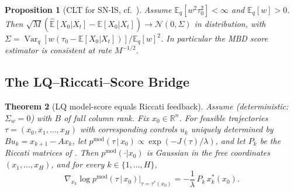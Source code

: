 \documentclass[11pt,letterpaper]{article}
\theoremstyle{plain}
\newtheorem{theorem}{Theorem}[section]
\newtheorem{proposition}[theorem]{Proposition}
\theoremstyle{definition}
\theoremstyle{remark}
\newcommand{\R}{\mathbb{R}}
\newcommand{\E}{\mathbb{E}}
\newcommand{\Var}{\operatorname{Var}}
\newcommand{\calN}{\mathcal{N}}
\newcommand{\grad}{\nabla}
\begin{document}
\begin{proposition}[CLT for SN-IS, cf.\ {\citep[Thm.~9.2]{owen2013mcb}}]\label{prop:snis}
Assume $\E_q[w^2\tau_0^2]<\infty$ and $\E_q[w]>0$. Then
$\sqrt{M}(\widehat{\E}[X_0|X_t]-\E[X_0|X_t])\to\calN(0,\Sigma)$ in
distribution, with $\Sigma=\Var_q[w(\tau_0-\E[X_0|X_t])]/\E_q[w]^2$.
In particular the MBD score estimator is consistent at rate $M^{-1/2}$.
\end{proposition}

\subsection{The LQ--Riccati--Score Bridge}

\begin{theorem}[LQ model-score equals Riccati feedback]\label{thm:lq-score-app}
Assume  (deterministic: $\Sigma_w=0$) with $B$ of full column
rank. Fix $x_0\in\R^n$. For feasible trajectories
$\tau=(x_0,x_1,\dots,x_H)$ with corresponding controls $u_k$ uniquely
determined by $Bu_k=x_{k+1}-Ax_k$, let
$p^{\mathrm{mod}}(\tau\,|\,x_0)\propto\exp(-J(\tau)/\lambda)$,
and let $P_k$ be the Riccati matrices of . Then
$p^{\mathrm{mod}}(\cdot|x_0)$ is Gaussian in the free coordinates
$(x_1,\dots,x_H)$, and for every $k\in\{1,\dots,H\}$,
\begin{equation}
  \grad_{x_k}\log p^{\mathrm{mod}}(\tau\,|\,x_0)\bigg|_{\tau=\tau^*(x_0)}
  = -\frac{1}{\lambda}\,P_k\,x_k^*(x_0).
  \label{eq:lq-score-app}
\end{equation}
\end{theorem}
\end{document}
